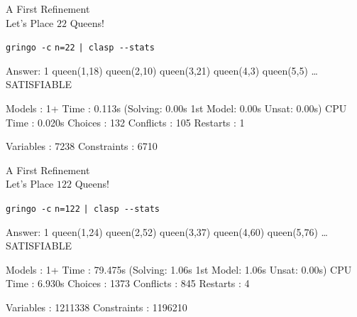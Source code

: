 \begin{frame}[fragile]{A First Refinement\\
              \normalsize Let's Place \alert{$22$} Queens!}
\begin{block}{\alert<1>{\lstinline{gringo -c} \alert{\lstinline{n=22}}  \lstinline{| clasp --stats}}}
\vspace*{-3mm}
\pause\footnotesize%
\begin{semiverbatim}
Answer: 1
queen(1,18) queen(2,10) queen(3,21) queen(4,3) queen(5,5) \dots{}
SATISFIABLE

Models      : 1+
\alert<2>{Time        : 0.113s} (Solving: 0.00s 1st Model: 0.00s Unsat: 0.00s)
CPU Time    : 0.020s
Choices     : 132
\alert<2>{Conflicts   : 105}
Restarts    : 1

Variables   : 7238
Constraints : 6710
\end{semiverbatim}
\end{block}
\end{frame}
\begin{frame}[fragile]{A First Refinement\\
              \normalsize Let's Place \alert{$122$} Queens!}
\begin{block}{\alert<1>{\lstinline{gringo -c} \alert{\lstinline{n=122}}  \lstinline{| clasp --stats}}}
\vspace*{-3mm}
\pause\footnotesize%
\begin{semiverbatim}
Answer: 1
queen(1,24) queen(2,52) queen(3,37) queen(4,60) queen(5,76) \dots{}
SATISFIABLE

Models      : 1+
\alert<2>{Time        : 79.475s} (\alert<2>{Solving: 1.06s} 1st Model: 1.06s Unsat: 0.00s)
CPU Time    : 6.930s
Choices     : 1373
\alert<2>{Conflicts   : 845}
Restarts    : 4

\alert<3>{Variables   : 1211338}
\alert<3>{Constraints : 1196210}
\end{semiverbatim}
\end{block}
\end{frame}
